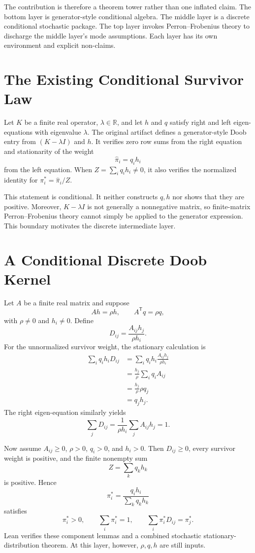 \documentclass[11pt]{article}
\begin{document}
The contribution is therefore a theorem tower rather than one inflated claim.
The bottom layer is generator-style conditional algebra. The middle layer is a
discrete conditional stochastic package. The top layer invokes
Perron--Frobenius theory to discharge the middle layer's mode assumptions. Each
layer has its own environment and explicit non-claims.

\section{The Existing Conditional Survivor Law}

Let \(K\) be a finite real operator, \(\lambda\in\mathbb{R}\), and let \(h\)
and \(q\) satisfy right and left eigen-equations with eigenvalue \(\lambda\).
The original artifact defines a generator-style Doob entry from
\((K-\lambda I)\) and \(h\). It verifies zero row sums from the right equation
and stationarity of the weight
\[
  \widehat{\pi}_i=q_i h_i
\]
from the left equation. When \(Z=\sum_i q_i h_i\neq 0\), it also verifies the
normalized identity for \(\pi_i^*=\widehat{\pi}_i/Z\).

This statement is conditional. It neither constructs \(q,h\) nor shows that
they are positive. Moreover, \(K-\lambda I\) is not generally a nonnegative
matrix, so finite-matrix Perron--Frobenius theory cannot simply be applied to
the generator expression. This boundary motivates the discrete intermediate
layer.

\section{A Conditional Discrete Doob Kernel}

Let \(A\) be a finite real matrix and suppose
\[
  Ah=\rho h,\qquad A^\mathsf{T}q=\rho q,
\]
with \(\rho\neq 0\) and \(h_i\neq0\). Define
\[
  D_{ij}=\frac{A_{ij}h_j}{\rho h_i}.
\]
For the unnormalized survivor weight, the stationary calculation is
\begin{align*}
\sum_i q_i h_i D_{ij}
  &=\sum_i q_i h_i\frac{A_{ij}h_j}{\rho h_i}\\
  &=\frac{h_j}{\rho}\sum_i q_iA_{ij}\\
  &=\frac{h_j}{\rho}\rho q_j\\
  &=q_jh_j.
\end{align*}
The right eigen-equation similarly yields
\[
  \sum_j D_{ij}
  =\frac{1}{\rho h_i}\sum_j A_{ij}h_j
  =1.
\]

Now assume \(A_{ij}\ge0\), \(\rho>0\), \(q_i>0\), and \(h_i>0\). Then
\(D_{ij}\ge0\), every survivor weight is positive, and the finite nonempty sum
\[
  Z=\sum_k q_kh_k
\]
is positive. Hence
\[
  \pi_i^*=\frac{q_i h_i}{\sum_k q_kh_k}
\]
satisfies
\[
  \pi_i^*>0,\qquad \sum_i\pi_i^*=1,\qquad
  \sum_i\pi_i^*D_{ij}=\pi_j^*.
\]
Lean verifies these component lemmas and a combined stochastic
stationary-distribution theorem. At this layer, however, \(\rho,q,h\) are still
inputs.
\end{document}
